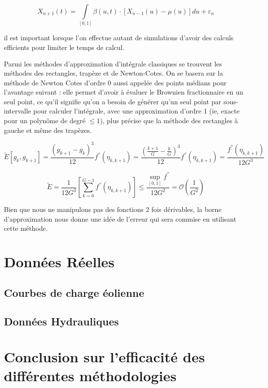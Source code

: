 $$X_{n+1}(t) = \int\limits_{[0,1]} \beta(u,t) \cdot \left[ X_{n-1}(u) - \mu(u)\right]du + \varepsilon_n$$

il est important lorsque l'on effectue autant de simulations d'avoir des calculs efficients pour limiter le temps de calcul.

Parmi les méthodes d'approximation d'intégrale classiques se trouvent les méthodes des rectangles, trapèze et de Newton-Cotes. On se basera sur la méthode de Newton Cotes d'ordre 0 aussi appelée des points médians pour l'avantage suivant : elle permet d'avoir à évaluer le Brownien fractionnaire en un seul point, ce qu'il signifie qu'on a besoin de générer qu'un seul point par sous-intervalle pour calculer l'intégrale, avec une approximation d'ordre 1 (ie, exacte pour un polynôme de degré $\leq 1$), plus précise que la méthode des rectangles à gauche et même des trapèzes.

$$\tilde E[g_{k}, g_{k+1}] = \frac{(g_{k+1}-g_k)^3}{12}f ^{''}(\eta_{k,k+1}) = \frac{(\frac{k+1} G - \frac k G )^3}{12}f ^{''}(\eta_{k,k+1}) = \frac{f ^{''}(\eta_{k,k+1})}{12G^3}$$

$$\tilde E = \frac 1 {12 G^3} \left[\sum_{k=0}^{G-1}f ^{''}(\eta_{k, k+1})\right] \leq \frac{\sup\limits_{[0,1]} f^{''} }{12 G^2}= \mathcal O\left( \frac 1 {G^2} \right)$$

Bien que nous ne manipulons pas des fonctions 2 fois dérivables, la borne d'approximation nous donne une idée de l'erreur qui sera commise en utilisant cette méthode.




\section{Données Réelles}

\subsection{Courbes de charge éolienne}

\subsection{Données Hydrauliques}

\section{Conclusion sur l'efficacité des différentes méthodologies}